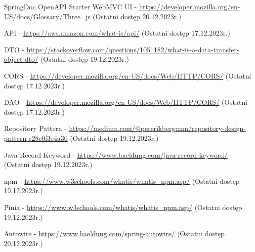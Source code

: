 \documentclass[11pt,a4paper]{article}
\begin{document}
\begin{thebibliography}{9}
SpringDoc OpenAPI Starter WebMVC UI - \url{https://developer.mozilla.org/en-US/docs/Glossary/Three_js} (Ostatni dostęp 20.12.2023r.)

API - \url{https://aws.amazon.com/what-is/api/} (Ostatni dostęp 17.12.2023r.)

DTO - \url{https://stackoverflow.com/questions/1051182/what-is-a-data-transfer-object-dto/} (Ostatni dostęp 19.12.2023r.)

CORS - \url{https://developer.mozilla.org/en-US/docs/Web/HTTP/CORS/} (Ostatni dostęp 17.12.2023r.)

DAO - \url{https://developer.mozilla.org/en-US/docs/Web/HTTP/CORS/} (Ostatni dostęp 17.12.2023r.)

Repository Pattern - \url{https://medium.com/@pererikbergman/repository-design-pattern-e28c0f3e4a30} (Ostatni dostęp 19.12.2023r.)

Java Record Keyword - \url{https://www.baeldung.com/java-record-keyword/} (Ostatni dostęp 19.12.2023r.)

npm - \url{https://www.w3schools.com/whatis/whatis_npm.asp/} (Ostatni dostęp 19.12.2023r.)

Pinia - \url{https://www.w3schools.com/whatis/whatis_npm.asp/} (Ostatni dostęp 19.12.2023r.)

Autowire - \url{https://www.baeldung.com/spring-autowire/} (Ostatni dostęp 20.12.2023r.)



\end{thebibliography}


\end{document}
